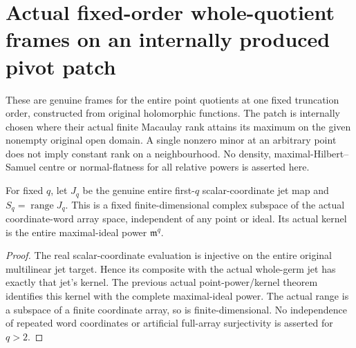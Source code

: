 \section{Actual fixed-order whole-quotient frames on an internally produced pivot patch}
\label{sec:hironaka-holomorphic-jet-quotient-frames}

These are genuine frames for the entire point quotients at one fixed truncation
order, constructed from original holomorphic functions. The patch is internally
chosen where their actual finite Macaulay rank attains its maximum on the given
nonempty original open domain. A single nonzero minor at an arbitrary point does
not imply constant rank on a neighbourhood. No density, maximal-Hilbert--Samuel
centre or normal-flatness for all relative powers is asserted here.

\begin{definition}
\label{hir:actual-fixed-whole-scalar-jet-range}
\leanok
{}
For fixed $q$, let $J_q$ be the genuine entire first-$q$ scalar-coordinate jet
map and $S_q=\operatorname{range}J_q$. This is a fixed finite-dimensional
complex subspace of the actual coordinate-word array space, independent of
any point or ideal. Its actual kernel is the entire maximal-ideal power
$\mathfrak m^q$.
\end{definition}
\begin{proof}
The real scalar-coordinate evaluation is injective on the entire original
multilinear jet target. Hence its composite with the actual whole-germ jet has
exactly that jet's kernel. The previous actual point-power/kernel theorem
identifies this kernel with the complete maximal-ideal power. The actual range
is a subspace of a finite coordinate array, so is finite-dimensional. No
independence of repeated word coordinates or artificial full-array surjectivity
is asserted for $q>2$.
\end{proof}

